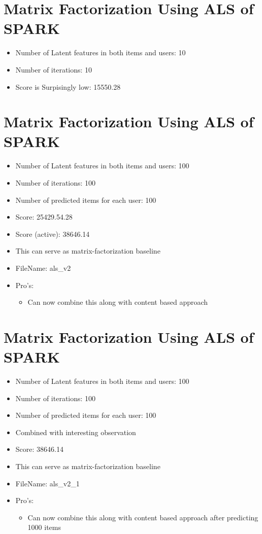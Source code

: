 \documentclass{article}
\begin{document}
\section{Matrix Factorization Using ALS of SPARK}
\begin{itemize}
 \item Number of Latent features in both items and users: 10
 \item Number of iterations: 10
 \item Score is Surpisingly low:  15550.28
\end{itemize}

\section{Matrix Factorization Using ALS of SPARK}
\begin{itemize}
 \item Number of Latent features in both items and users: 100
 \item Number of iterations: 100
 \item Number of predicted items for each user: 100
 \item Score:  25429.54.28
 \item Score (active): 38646.14
 \item This can serve as matrix-factorization baseline
 \item FileName: als\_v2
 \item Pro's:
 \begin{itemize}
 \item Can now combine this along with content based approach
 \end{itemize}
 
\end{itemize}

\section{Matrix Factorization Using ALS of SPARK}

\begin{itemize}
 \item Number of Latent features in both items and users: 100
 \item Number of iterations: 100
 \item Number of predicted items for each user: 100
 \item Combined with interesting observation
 \item Score:  38646.14
 \item This can serve as matrix-factorization baseline
 \item FileName: als\_v2\_1
 \item Pro's:
 \begin{itemize}
 \item Can now combine this along with content based approach after predicting 1000 items
 \end{itemize}
 
\end{itemize}
\end{document}
